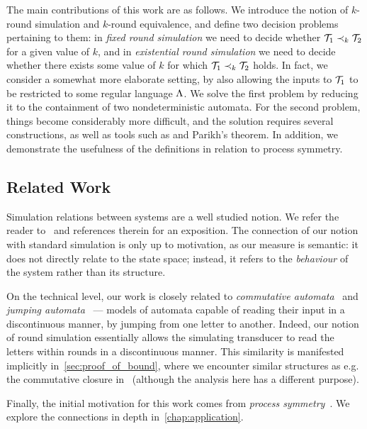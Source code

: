 The main contributions of this work are as follows. We introduce the notion of $k$-round simulation and $k$-round equivalence, and define two decision problems pertaining to them: in \emph{fixed round simulation} we need to decide whether $\mathcal{T}_1\prec_k \mathcal{T}_2$ for a given value of $k$, and in \emph{existential round simulation} we need to decide whether there exists some value of $k$ for which $\mathcal{T}_1\prec_k \mathcal{T}_2$ holds. In fact, we consider a somewhat more elaborate setting, by also allowing the inputs to $\mathcal{T}_1$ to be restricted to some regular language $\Lambda$.
We solve the first problem by reducing it to the containment of two nondeterministic automata. For the second problem, things become considerably more difficult, and the solution requires several constructions, as well as tools such as  and Parikh's theorem. 
In addition, we demonstrate the usefulness of the definitions in relation to process symmetry.

\subsection*{Related Work}
Simulation relations between systems are a well studied notion. We refer the reader to~\cite[Chapter 13]{Clarke2018a} and references therein for an exposition. The connection of our notion with standard simulation is only up to motivation, as our measure is semantic: it does not directly relate to the state space; instead, it refers to the \emph{behaviour} of the system rather than its structure.

On the technical level, our work is closely related to \emph{commutative automata}~\cite{Brzozowski1973} and \emph{jumping automata}~\cite{Fernau2015,Meduna2012} --- models of automata capable of reading their input in a discontinuous manner, by jumping from one letter to another. Indeed, our notion of round simulation essentially allows the simulating transducer to read the letters within rounds in a discontinuous manner. This similarity is manifested implicitly in~\cref{sec:proof_of_bound}, where we encounter similar structures as e.g. the commutative closure in~\cite{Hoffmann2020} (although the analysis here has a different purpose).

Finally, the initial motivation for this work comes from \emph{process symmetry}~\cite{Almagor2020b,Clarke1996,Emerson1996,Ip1996,Lin2016}. We explore the connections in depth in~\cref{chap:application}.

